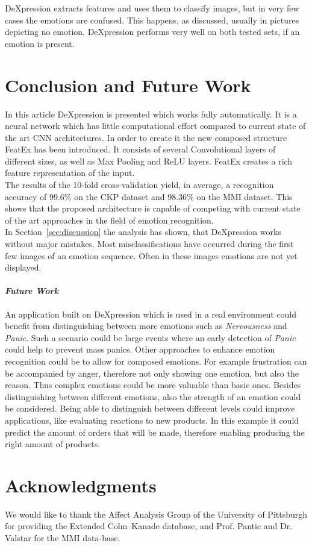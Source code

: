\documentclass[10pt,journal,compsoc, hidelinks]{IEEEtran}
\newcommand{\paraV}{\vspace{1em}}
\begin{document}
DeXpression extracts features and uses them to classify images, but in very few cases the emotions are confused. This happens, as discussed, usually in pictures depicting no emotion. DeXpression performs very well on both tested sets, if an emotion is present.

 \section{Conclusion and Future Work}
\label{sec:conclusion}

In this article DeXpression is presented which works fully automatically. It is a neural network which has little computational effort compared to current state of the art CNN architectures. In order to create it the new composed structure FeatEx has been introduced. It consists of several Convolutional layers of different sizes, as well as Max Pooling and ReLU layers. FeatEx creates a rich feature representation of the input. \\
The results of the 10-fold cross-validation yield, in average, a recognition accuracy of 99.6\% on the CKP dataset and 98.36\% on the MMI dataset. This shows that the proposed architecture is capable of competing with current state of the art approaches in the field of emotion recognition.\\
In Section~\ref{sec:discussion} the analysis has shown, that DeXpression works without major mistakes. Most misclassifications have occurred during the first few images of an emotion sequence. Often in these images emotions are not yet displayed.

\paraV
\paragraph{\textit{Future Work}}

An application built on DeXpression which is used in a real environment could benefit from distinguishing between more emotions such as \textit{Nervousness} and \textit{Panic}. Such a scenario could be large events where an early detection of \textit{Panic} could help to prevent mass panics. Other approaches to enhance emotion recognition could be to allow for composed emotions. For example frustration can be accompanied by anger, therefore not only showing one emotion, but also the reason. Thus complex emotions could be more valuable than basic ones. Besides distinguishing between different emotions, also the strength of an emotion could be considered. Being able to distinguish between different levels could improve applications, like evaluating reactions to new products. In this example it could predict the amount of orders that will be made, therefore enabling producing the right amount of products. 

\section*{Acknowledgments}

We would like to thank the Affect Analysis Group of the University of Pittsburgh for providing the Extended Cohn–Kanade database, and Prof. Pantic and Dr. Valstar for the MMI data-base.





\end{document}
